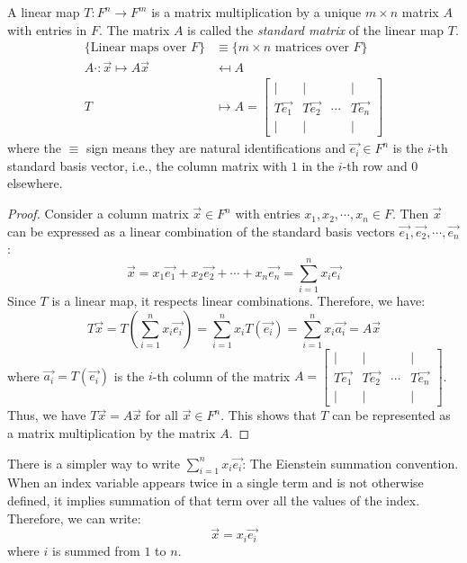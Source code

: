 \documentclass[
	11pt, %
	fleqn, %
	a4paper, %
]{LegrandOrangeBook}
\begin{document}
\begin{proposition}
    A linear map $T: F^n \to F^m$ is a matrix multiplication by a unique $m \times n$ matrix $A$ with entries in $F$. The matrix $A$ is called the \emph{standard matrix} of the linear map $T$.
    \[
        \begin{split}
            \{ \text{Linear maps over } F \} &\equiv \{ m \times n \text{ matrices over } F \} \\
            A\cdot : \vec{x} \mapsto A\vec{x} &\mapsfrom A \\
            T &\mapsto A = \begin{bmatrix}
                | & | & & | \\
                T\vec{e_1} & T\vec{e_2} & \cdots & T\vec{e_n} \\
                | & | & & |
            \end{bmatrix}
        \end{split}
    \]
    where the $\equiv$ sign means they are natural identifications and $\vec{e_i} \in F^n$ is the $i$-th standard basis vector, i.e., the column matrix with $1$ in the $i$-th row and $0$ elsewhere.
\end{proposition}

\begin{proof}
    Consider a column matrix $\vec{x} \in F^n$ with entries $x_1, x_2, \cdots, x_n \in F$. Then $\vec{x}$ can be expressed as a linear combination of the standard basis vectors $\vec{e_1}, \vec{e_2}, \cdots, \vec{e_n}$:
    \[
        \vec{x} = x_1 \vec{e_1} + x_2 \vec{e_2} + \cdots + x_n \vec{e_n} = \sum_{i=1}^{n} x_i \vec{e_i}
    \]
    Since $T$ is a linear map, it respects linear combinations. Therefore, we have:
    \[
        T\vec{x} = T\left( \sum_{i=1}^{n} x_i \vec{e_i} \right) = \sum_{i=1}^{n} x_i T(\vec{e_i}) = \sum_{i=1}^{n} x_i \vec{a_i} = A\vec{x}
    \]
    where $\vec{a_i} = T(\vec{e_i})$ is the $i$-th column of the matrix $A = \begin{bmatrix}
        | & | & & | \\
        T\vec{e_1} & T\vec{e_2} & \cdots & T\vec{e_n} \\
        | & | & & |
    \end{bmatrix}$. Thus, we have $T\vec{x} = A\vec{x}$ for all $\vec{x} \in F^n$. This shows that $T$ can be represented as a matrix multiplication by the matrix $A$.
\end{proof}

\begin{remark}
    There is a simpler way to write $\sum_{i=1}^{n} x_i \vec{e_i}$: The Eienstein summation convention. When an index variable appears twice in a single term and is not otherwise defined, it implies summation of that term over all the values of the index. Therefore, we can write:
    \[
        \vec{x} = x_i \vec{e_i}
    \]
    where $i$ is summed from $1$ to $n$.
\end{remark}
\end{document}
